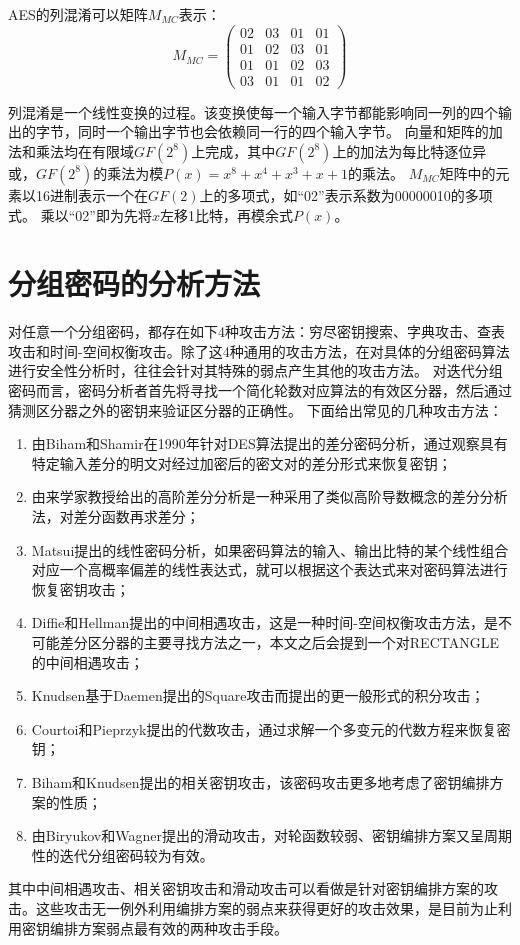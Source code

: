 AES的列混淆可以矩阵$M_{MC}$表示：
\begin{equation}
    M_{MC}=\left(
    \begin{array}{cccc}
        02&03&01&01\\
        01&02&03&01\\
        01&01&02&03\\
        03&01&01&02
    \end{array}
\right)
\label{eq:MC}
\end{equation}

列混淆是一个线性变换的过程。该变换使每一个输入字节都能影响同一列的四个输出的字节，同时一个输出字节也会依赖同一行的四个输入字节。
向量和矩阵的加法和乘法均在有限域$GF(2^8)$上完成，其中$GF(2^8)$上的加法为每比特逐位异或，$GF(2^8)$的乘法为模$P(x)=x^8+x^4+x^3+x+1$的乘法。
$M_{MC}$矩阵中的元素以16进制表示一个在$GF(2)$上的多项式，如“02”表示系数为00000010的多项式。
乘以“02”即为先将$x$左移1比特，再模余式$P(x)$。 

\section{分组密码的分析方法}
对任意一个分组密码，都存在如下4种攻击方法：穷尽密钥搜索、字典攻击、查表攻击和时间-空间权衡攻击。除了这4种通用的攻击方法，在对具体的分组密码算法进行安全性分析时，往往会针对其特殊的弱点产生其他的攻击方法。
对迭代分组密码而言，密码分析者首先将寻找一个简化轮数对应算法的有效区分器，然后通过猜测区分器之外的密钥来验证区分器的正确性。
下面给出常见的几种攻击方法：
\begin{enumerate}
    \item 由Biham和Shamir在1990年针对DES算法提出的差分密码分析\cite{biham1991differential}，通过观察具有特定输入差分的明文对经过加密后的密文对的差分形式来恢复密钥；
    \item 由来学家教授给出的高阶差分分析\cite{lai1994higher}是一种采用了类似高阶导数概念的差分分析法，对差分函数再求差分；
    \item Matsui提出的线性密码分析\cite{matsui1993linear}，如果密码算法的输入、输出比特的某个线性组合对应一个高概率偏差的线性表达式，就可以根据这个表达式来对密码算法进行恢复密钥攻击；
    \item Diffie和Hellman提出的中间相遇攻击\cite{diffie1977special}，这是一种时间-空间权衡攻击方法，是不可能差分区分器的主要寻找方法之一，本文之后会提到一个对RECTANGLE的中间相遇攻击；
    \item Knudsen基于Daemen提出的Square攻击\cite{daemen1997block}而提出的更一般形式的积分攻击\cite{knudsen2002integral}；
    \item Courtoi和Pieprzyk提出的代数攻击\cite{courtois2002cryptanalysis}，通过求解一个多变元的代数方程来恢复密钥；
    \item Biham和Knudsen提出的相关密钥攻击\cite{biham1994new}，该密码攻击更多地考虑了密钥编排方案的性质；
    \item 由Biryukov和Wagner提出的滑动攻击\cite{biryukov1999slide}，对轮函数较弱、密钥编排方案又呈周期性的迭代分组密码较为有效。
\end{enumerate}

其中中间相遇攻击、相关密钥攻击和滑动攻击可以看做是针对密钥编排方案的攻击。这些攻击无一例外利用编排方案的弱点来获得更好的攻击效果，是目前为止利用密钥编排方案弱点最有效的两种攻击手段。
